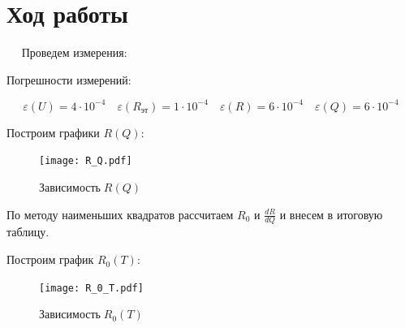 \documentclass[12pt,a4paper]{article}
\begin{document}
	\section*{Ход работы}
	
	$\quad$  Проведем измерения:
	
	\begin{table}[]
		\begin{subtable}{0.4\textwidth}
			\caption*{$T = 22.0 \; ^{\circ} C$}
			
		\end{subtable}
		\begin{subtable}{0.4\textwidth}
			\caption*{$T = 30.0 \; ^{\circ} C$}
			
		\end{subtable}
	\hfill
		\begin{subtable}{0.4\textwidth}
			\caption*{$T = 40.0 \; ^{\circ} C$}
			
		\end{subtable}
		\begin{subtable}{0.4\textwidth}
			\caption*{$T = 50.0 \; ^{\circ} C$}
			
		\end{subtable}
	\hfill
		\begin{subtable}{0.4\textwidth}
			\caption*{$T = 60.0 \; ^{\circ} C$}
			
		\end{subtable}
		\begin{subtable}{0.4\textwidth}
			\caption*{$T = 70.0 \; ^{\circ} C$}
			
		\end{subtable}
	\end{table}

	Погрешности измерений: 
	
	$$\varepsilon(U) = 4 \cdot 10^{-4}  \quad \varepsilon(R_{\text{эт}}) = 1 \cdot 10^{-4} \quad \varepsilon(R) = 6 \cdot 10^{-4} \quad \varepsilon(Q) = 6 \cdot 10^{-4}$$

\newpage
	
	Построим графики $R (Q)$:
	
	\begin{figure}[h]
		\texttt{[image: R\_Q.pdf]}
		\caption{$ \text{Зависимость} \; R(Q)$}
	\end{figure}
	
	По методу наименьших квадратов рассчитаем $R_0$ и $\frac{dR}{dQ}$ и внесем в итоговую таблицу.
	
	Построим график $R_0(T)$:
	
	\begin{figure}[h]
		\texttt{[image: R\_0\_T.pdf]}
		\caption{$ \text{Зависимость} \; R_0(T)$}
	\end{figure}
	
\end{document}
